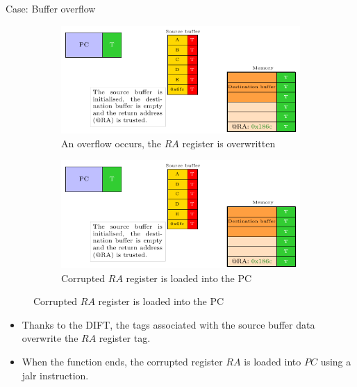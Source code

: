 \begin{frame}{Case: Buffer overflow}
    \begin{figure}
        \centering
        \begin{subfigure}[l]{.45\textwidth}
            \centering
            \includegraphics[width=.9\textwidth, page=3]{src/2_vuln_assessment/img/buffer_overflow/schemaPedagogique.pdf}
            \caption{An overflow occurs, the $RA$ register is overwritten}
            \label{fig:bo_3_step}
        \end{subfigure}
        \begin{subfigure}[r]{.45\textwidth}
            \centering
            \includegraphics[width=.9\textwidth, page=4]{src/2_vuln_assessment/img/buffer_overflow/schemaPedagogique.pdf}
            \caption{Corrupted $RA$ register is loaded into the PC}
            \label{fig:bo_4_step}
        \end{subfigure}
    \end{figure}

    \begin{itemize}
        \item Thanks to the DIFT, the tags associated with the source buffer data overwrite the $RA$ register tag.
        \item When the function ends, the corrupted register $RA$ is loaded into $PC$ using a jalr instruction.
    \end{itemize}
\end{frame}

